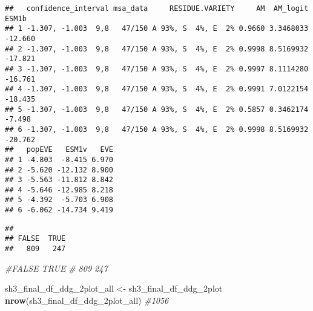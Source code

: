 \documentclass[
]{article}
\newenvironment{Shaded}{\begin{snugshade}}{\end{snugshade}}
\newcommand{\CommentTok}[1]{\textcolor[rgb]{0.56,0.35,0.01}{\textit{#1}}}
\newcommand{\ConstantTok}[1]{\textcolor[rgb]{0.56,0.35,0.01}{#1}}
\newcommand{\DecValTok}[1]{\textcolor[rgb]{0.00,0.00,0.81}{#1}}
\newcommand{\FunctionTok}[1]{\textcolor[rgb]{0.13,0.29,0.53}{\textbf{#1}}}
\newcommand{\NormalTok}[1]{#1}
\newcommand{\OtherTok}[1]{\textcolor[rgb]{0.56,0.35,0.01}{#1}}
\newcommand{\SpecialCharTok}[1]{\textcolor[rgb]{0.81,0.36,0.00}{\textbf{#1}}}
\begin{document}
\begin{verbatim}
##   confidence_interval msa_data     RESIDUE.VARIETY     AM  AM_logit   ESM1b
## 1 -1.307, -1.003  9,8   47/150 A 93%, S  4%, E  2% 0.9660 3.3468033 -12.660
## 2 -1.307, -1.003  9,8   47/150 A 93%, S  4%, E  2% 0.9998 8.5169932 -17.821
## 3 -1.307, -1.003  9,8   47/150 A 93%, S  4%, E  2% 0.9997 8.1114280 -16.761
## 4 -1.307, -1.003  9,8   47/150 A 93%, S  4%, E  2% 0.9991 7.0122154 -18.435
## 5 -1.307, -1.003  9,8   47/150 A 93%, S  4%, E  2% 0.5857 0.3462174  -7.498
## 6 -1.307, -1.003  9,8   47/150 A 93%, S  4%, E  2% 0.9998 8.5169932 -20.762
##   popEVE   ESM1v   EVE
## 1 -4.803  -8.415 6.970
## 2 -5.620 -12.132 8.900
## 3 -5.563 -11.812 8.842
## 4 -5.646 -12.985 8.218
## 5 -4.392  -5.703 6.908
## 6 -6.062 -14.734 9.419
\end{verbatim}

\begin{Shaded}
\end{Shaded}

\begin{verbatim}
## 
## FALSE  TRUE 
##   809   247
\end{verbatim}

\begin{Shaded}
\begin{Highlighting}[]
\CommentTok{\#FALSE  TRUE }
\CommentTok{\#  809   247 }

\NormalTok{sh3\_final\_df\_ddg\_2plot\_all }\OtherTok{\textless{}{-}}\NormalTok{ sh3\_final\_df\_ddg\_2plot}
\FunctionTok{nrow}\NormalTok{(sh3\_final\_df\_ddg\_2plot\_all) }\CommentTok{\#1056}
\end{Highlighting}
\end{Shaded}
\end{document}
